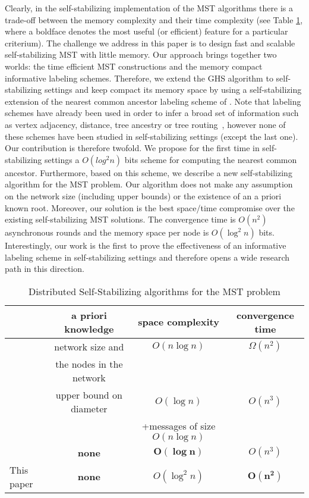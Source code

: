 \documentclass[11pt,a4paper]{article}
\begin{document}
Clearly, in the self-stabilizing implementation of the MST algorithms there is a trade-off between 
the memory complexity and their time complexity (see Table \ref{tableresume}, where a boldface denotes the most useful (or efficient) feature for a particular criterium). The challenge we address in this paper is to design fast 
and scalable self-stabilizing MST with little memory. Our approach brings together two worlds: the time efficient 
MST constructions and the memory compact informative labeling schemes. 
Therefore, we extend
the GHS algorithm to self-stabilizing settings and keep compact its 
memory space by using a self-stabilizing extension 
of the nearest common ancestor labeling scheme of \cite{AGKR02}.
Note that labeling schemes have already been used in 
order to infer a broad set of information such as
vertex adjacency, distance, tree ancestry or tree routing~\cite{BeinDV05},  
however none of these schemes have been studied in self-stabilizing
settings (except the last one).\\







Our contribution is therefore twofold. 
We propose for the first time in self-stabilizing settings a $O(log^2n)$ bits 
scheme for computing the nearest common ancestor. 
Furthermore, based on this scheme, we describe a new 
self-stabilizing algorithm for the MST
problem. Our algorithm does not make any assumption on the network size
(including upper bounds) or the existence of an a priori known root. Moreover,
our solution is the best space/time compromise over the existing self-stabilizing MST solutions.
The convergence time is $O(n^2)$ asynchronous rounds 
and the memory space per node is 
$O(\log^2 n)$ bits. Interestingly, our work is the first to prove the effectiveness 
of an informative labeling scheme in self-stabilizing settings and therefore 
opens a wide research path in this direction.   
 
\begin{table}[t]
\begin{center}
\scalebox{1}
{
\begin{tabular}{|l|c|c|c|}
\hline
 & a priori knowledge & space complexity & convergence time\\
\hline
 \cite{AntonoiuS97} & network size and & $O(n \log n)$ & $\Omega(n^2)$ \\
 &  the nodes in the network & & \\
\hline
 \cite{HighamL01}& upper bound  on diameter &$O(\log n)$& $O(n^3)$\\
 & & +messages of size $O(n\log n)$ & \\
\hline
\cite{BPRT09c}  & \textbf{none} &  $\mathbf{O(\log n)}$ & $O(n^3)$\\
\hline
This paper & \textbf{none} & $O(\log^2 n)$ & $\mathbf{O(n^2)}$\\
\hline
\end{tabular}
}
\caption{\small Distributed Self-Stabilizing algorithms for the MST problem}
\label{tableresume}
\end{center}
\end{table}
\end{document}
